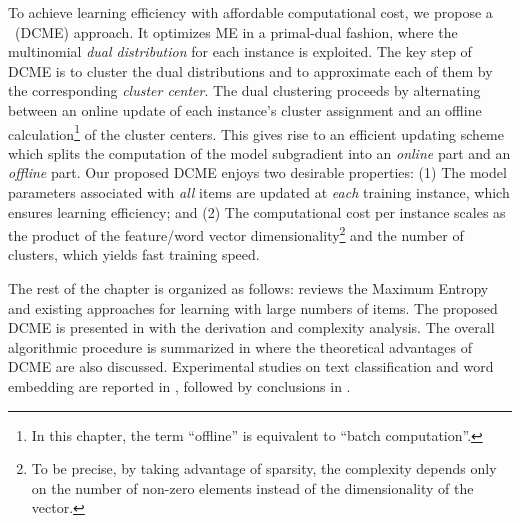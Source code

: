 To achieve learning efficiency with affordable computational cost, we propose a
\DCME{}~(DCME) approach. It optimizes ME in a primal-dual fashion, where the
multinomial \emph{dual distribution} for each instance is exploited. The key
step of DCME is to cluster the dual distributions and to approximate each of
them by the corresponding \emph{cluster center}. The dual clustering proceeds by
alternating between an online update of each instance's cluster assignment and
an offline calculation\footnote{In this chapter, the term ``offline'' is
equivalent to ``batch computation''. } of the cluster centers. This gives rise
to an efficient updating scheme which splits the computation of the model
subgradient into an \emph{online} part and an \emph{offline} part. Our proposed
DCME enjoys two desirable properties: (1) The model parameters associated with
\emph{all} items are updated at \emph{each} training instance, which ensures
learning efficiency; and (2) The computational cost per instance scales as the
product of the feature/word vector dimensionality\footnote{To be precise, by
taking advantage of sparsity, the complexity depends only on the number of
non-zero elements instead of the dimensionality of the vector.} and the number
of clusters, which yields fast training speed.

The rest of the chapter is organized as follows:  reviews
the Maximum Entropy and existing approaches for learning with large numbers of
items. The proposed DCME is presented in  with the
derivation and complexity analysis. The overall algorithmic procedure is
summarized in  where the theoretical advantages of DCME are
also discussed. Experimental studies on text classification and word embedding
are reported in , followed by conclusions in
.
